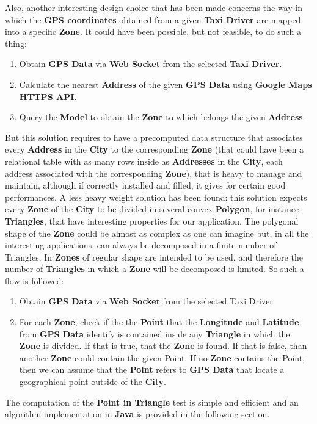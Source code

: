 Also, another interesting design choice that has been made concerns the way in which the \textbf{GPS coordinates} obtained from a given \textbf{Taxi Driver} are mapped into a specific \textbf{Zone}.
It could have been possible, but not feasible, to do such a thing:
\begin{enumerate}
	\item Obtain \textbf{GPS Data} via \textbf{Web Socket} from the selected \textbf{Taxi Driver}.
	\item Calculate the nearest \textbf{Address} of the given \textbf{GPS Data} using \textbf{Google Maps HTTPS API}.
	\item Query the \textbf{Model} to obtain the \textbf{Zone} to which belongs the given \textbf{Address}.
\end{enumerate}
But this solution requires to have a precomputed data structure that associates every \textbf{Address} in the \textbf{City} to the corresponding \textbf{Zone} (that could have been a relational table with as many rows inside as \textbf{Addresses} in the \textbf{City}, each address associated with the corresponding \textbf{Zone}), that is heavy to manage and maintain, although if correctly installed and filled, it gives for certain good performances.
A less heavy weight solution has been found: this solution expects every \textbf{Zone} of the \textbf{City} to be divided in several convex \textbf{Polygon}, for instance \textbf{Triangles}, that have interesting properties for our application.
The polygonal shape of the \textbf{Zone} could be almost as complex as one can imagine but, in all the interesting applications, can always be decomposed in a finite number of Triangles.
In \myTaxiService{} \textbf{Zones} of regular shape are intended to be used, and therefore the number of \textbf{Triangles} in which a \textbf{Zone} will be decomposed is limited.
So such a flow is followed:
\begin{enumerate}
	\item Obtain \textbf{GPS Data} via \textbf{Web Socket} from the selected Taxi Driver
	\item For each \textbf{Zone}, check if the the \textbf{Point} that the \textbf{Longitude} and \textbf{Latitude} from \textbf{GPS Data} identify is contained inside any \textbf{Triangle} in which the \textbf{Zone} is divided. If that is true, that the \textbf{Zone} is found. If that is false, than another \textbf{Zone} could contain the given Point. If no \textbf{Zone} contains the Point, then we can assume that the \textbf{Point} refers to \textbf{GPS Data} that locate a geographical point outside of the \textbf{City}.
\end{enumerate}
The computation of the \textbf{Point in Triangle} test is simple and efficient and an algorithm implementation in \textbf{Java} is provided in the following section.
